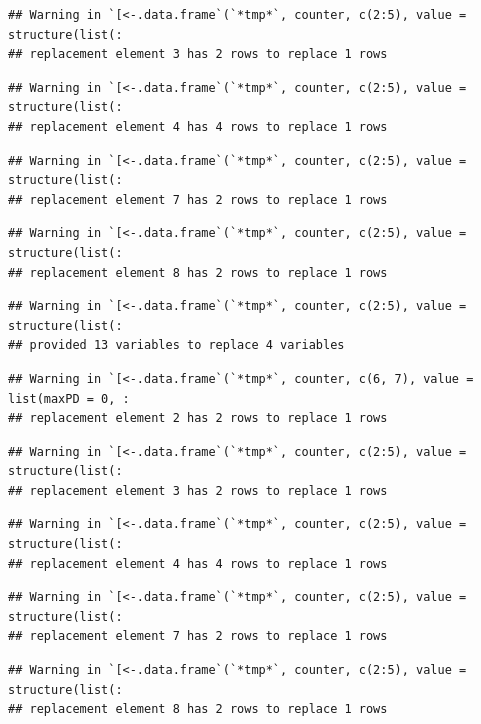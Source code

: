 \documentclass[]{article}
\begin{document}
\begin{verbatim}
## Warning in `[<-.data.frame`(`*tmp*`, counter, c(2:5), value = structure(list(:
## replacement element 3 has 2 rows to replace 1 rows
\end{verbatim}

\begin{verbatim}
## Warning in `[<-.data.frame`(`*tmp*`, counter, c(2:5), value = structure(list(:
## replacement element 4 has 4 rows to replace 1 rows
\end{verbatim}

\begin{verbatim}
## Warning in `[<-.data.frame`(`*tmp*`, counter, c(2:5), value = structure(list(:
## replacement element 7 has 2 rows to replace 1 rows
\end{verbatim}

\begin{verbatim}
## Warning in `[<-.data.frame`(`*tmp*`, counter, c(2:5), value = structure(list(:
## replacement element 8 has 2 rows to replace 1 rows
\end{verbatim}

\begin{verbatim}
## Warning in `[<-.data.frame`(`*tmp*`, counter, c(2:5), value = structure(list(:
## provided 13 variables to replace 4 variables
\end{verbatim}

\begin{verbatim}
## Warning in `[<-.data.frame`(`*tmp*`, counter, c(6, 7), value = list(maxPD = 0, :
## replacement element 2 has 2 rows to replace 1 rows
\end{verbatim}

\begin{verbatim}
## Warning in `[<-.data.frame`(`*tmp*`, counter, c(2:5), value = structure(list(:
## replacement element 3 has 2 rows to replace 1 rows
\end{verbatim}

\begin{verbatim}
## Warning in `[<-.data.frame`(`*tmp*`, counter, c(2:5), value = structure(list(:
## replacement element 4 has 4 rows to replace 1 rows
\end{verbatim}

\begin{verbatim}
## Warning in `[<-.data.frame`(`*tmp*`, counter, c(2:5), value = structure(list(:
## replacement element 7 has 2 rows to replace 1 rows
\end{verbatim}

\begin{verbatim}
## Warning in `[<-.data.frame`(`*tmp*`, counter, c(2:5), value = structure(list(:
## replacement element 8 has 2 rows to replace 1 rows
\end{verbatim}
\end{document}
